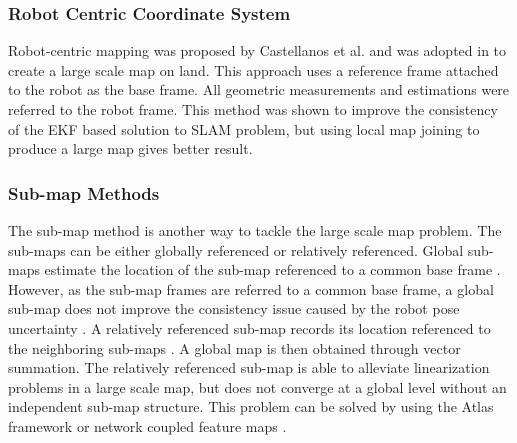 \subsubsection{Robot Centric Coordinate System}
Robot-centric mapping was proposed by Castellanos et al.
\cite{castellanos_limits_2004} and was adopted in
\cite{civera_1-point_2009} to create a large scale map on land. This
approach uses a reference frame attached to the robot as the base
frame. All geometric measurements and estimations were referred to the
robot frame. This method was shown to improve the consistency of the EKF
based solution to SLAM problem, but using local map joining to produce a large
map gives better result.

\subsubsection{Sub-map Methods}
The sub-map method is another way to tackle the large scale map problem.
The sub-maps can be either globally referenced or relatively
referenced. Global sub-maps estimate the location of the sub-map
referenced to a common base frame \cite{estrada_hierarchical_2005}
\cite{leonard_consistent_2003}. However, as the sub-map frames are
referred to a common base frame, a global sub-map does not improve the
consistency issue caused by the robot pose
uncertainty \cite{bailey_simultaneous_2006}. A relatively referenced
sub-map records its location referenced to the neighboring sub-maps
\cite{chong_feature-based_1999} \cite{williams_efficient_2001}. A global
map is then obtained through vector summation. The relatively
referenced sub-map is able to alleviate linearization problems in a large
scale map, but does not converge at a global level without an
independent sub-map structure. This problem can be solved by using
the Atlas framework or network coupled feature maps \cite{bosse_slam_2004}
\cite{bailey_mobile_2002}.

